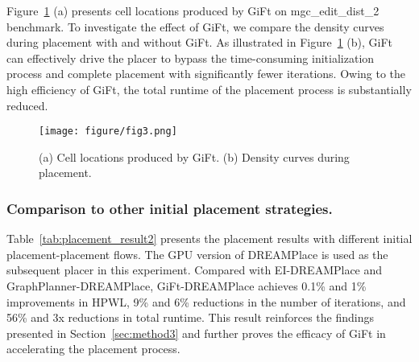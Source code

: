 Figure~\ref{fig:fig3} (a) presents cell locations produced by GiFt on mgc\_edit\_dist\_2 benchmark. To investigate the effect of GiFt, we compare the density curves during placement with and without GiFt. As illustrated in Figure~\ref{fig:fig3} (b), GiFt can effectively drive the placer to bypass the time-consuming initialization process and complete placement with significantly fewer iterations. Owing to the high efficiency of GiFt, the total runtime of the placement process is substantially reduced.

\begin{figure}[]
\texttt{[image: figure/fig3.png]}
\centering  
\caption{(a) Cell locations produced by GiFt. (b) Density curves during placement.}\label{fig:fig3}
\end{figure}


\subsubsection{Comparison to other initial placement strategies.}
Table~\ref{tab:placement_result2} presents the placement results with different initial placement-placement flows. The GPU version of DREAMPlace is used as the subsequent placer in this experiment. Compared with EI-DREAMPlace and GraphPlanner-DREAMPlace, GiFt-DREAMPlace achieves 0.1\% and 1\% improvements in HPWL, 9\% and 6\% reductions in the number of iterations, and 56\% and 3x reductions in total runtime. This result reinforces the findings presented in Section~\ref{sec:method3} and further proves the efficacy of GiFt in accelerating the placement process.

